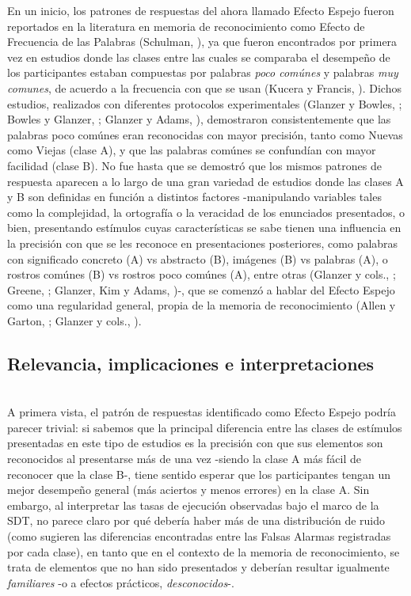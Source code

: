 En un inicio, los patrones de respuestas del ahora llamado Efecto Espejo fueron reportados en la literatura en memoria de reconocimiento como Efecto de Frecuencia de las Palabras (Schulman, \citeyear{Schulman1967}), ya que fueron encontrados por primera vez en estudios donde las clases entre las cuales se comparaba el desempeño de los participantes estaban compuestas por palabras \textit{poco comúnes} y palabras \textit{muy comunes}, de acuerdo a la frecuencia con que se usan (Kucera y Francis, \citeyear{Kucera1967}). Dichos estudios, realizados con diferentes protocolos experimentales (Glanzer y Bowles, \citeyear{Glanzer1976}; Bowles y Glanzer, \citeyear{Bowles1983}; Glanzer y Adams, \citeyear{Glanzer1990}), demostraron consistentemente que las palabras poco comúnes eran reconocidas con mayor precisión, tanto como Nuevas como Viejas (clase A), y que las palabras comúnes se confundían con mayor facilidad (clase B). No fue hasta que se demostró que los mismos patrones de respuesta aparecen a lo largo de una gran variedad de estudios donde las clases A y B son definidas en función a distintos factores -manipulando variables tales como la complejidad, la ortografía o la veracidad de los enunciados presentados, o bien, presentando estímulos cuyas características se sabe tienen una influencia en la precisión con que se les reconoce en presentaciones posteriores, como palabras con significado concreto (A) vs abstracto (B), imágenes (B) vs palabras (A), o rostros comúnes (B) vs rostros poco comúnes (A), entre otras (Glanzer y cols., \citeyear{Glanzer1993}; Greene, \citeyear{Greene1996}; Glanzer, Kim y Adams, \citeyear{Glanzer1998})-, que se comenzó a hablar del Efecto Espejo como una regularidad general, propia de la memoria de reconocimiento (Allen y Garton, \citeyear{Allen1968}; Glanzer y cols., \citeyear{Glanzer1993}).\\

\subsection{Relevancia, implicaciones e interpretaciones}\\

A primera vista, el patrón de respuestas identificado como Efecto Espejo podría parecer trivial: si sabemos que la principal diferencia entre las clases de estímulos presentadas en este tipo de estudios es la precisión con que sus elementos son reconocidos al presentarse más de una vez -siendo la clase A más fácil de reconocer que la clase B-, tiene sentido esperar que los participantes tengan un mejor desempeño general (más aciertos y menos errores) en la clase A. Sin embargo, al interpretar las tasas de ejecución observadas bajo el marco de la SDT, no parece claro por qué debería haber más de una distribución de ruido (como sugieren las diferencias encontradas entre las Falsas Alarmas registradas por cada clase), en tanto que en el contexto de la memoria de reconocimiento, se trata de elementos que no han sido presentados y deberían resultar igualmente \textit{familiares} -o a efectos prácticos, \textit{desconocidos}-.\\

